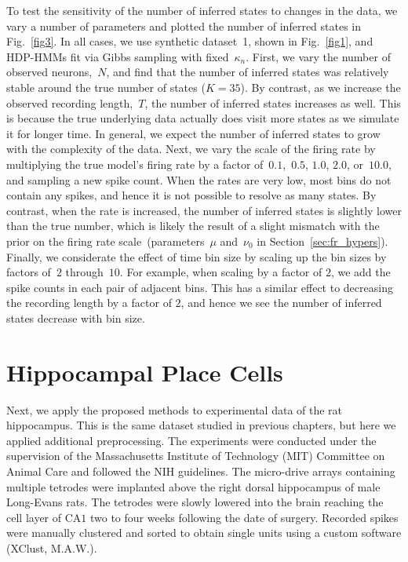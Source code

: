 To test the sensitivity of the number of inferred states to changes in
the data, we vary a number of parameters and plotted the number of
inferred states in Fig.~\ref{fig3}. In all cases, we use synthetic
dataset~1, shown in Fig.~\ref{fig1}, and HDP-HMMs fit via Gibbs
sampling with fixed~$\kappa_n$. First, we vary the number of
observed neurons,~$N$, and find that the number of inferred states was
relatively stable around the true number of states ($K=35$). By
contrast, as we increase the observed recording length,~$T$, the
number of inferred states increases as well. This is because the true
underlying data actually does visit more states as we simulate it for
longer time. In general, we expect the number of inferred states to
grow with the complexity of the data. Next, we vary the scale of the
firing rate by multiplying the true model's firing rate by a factor
of~$0.1$,~$0.5$, $1.0$, $2.0$, or~$10.0$, and sampling a new spike
count. When the rates are very low, most bins do not contain any
spikes, and hence it is not possible to resolve as many states. By
contrast, when the rate is increased, the number of inferred states is
slightly lower than the true number, which is likely the result of a
slight mismatch with the prior on the firing rate
scale~(parameters~$\mu$ and~$\nu_0$ in
Section~\ref{sec:fr_hypers}). Finally, we considerate the effect of
time bin size by scaling up the bin sizes by factors of~$2$
through~$10$. For example, when scaling by a factor of $2$, we add the
spike counts in each pair of adjacent bins. This has a similar effect
to decreasing the recording length by a factor of $2$, and hence we see
the number of inferred states decrease with bin size.

\section{Hippocampal Place Cells} 

Next, we apply the proposed methods to experimental data of the rat
hippocampus. This is the same dataset studied in previous chapters, but
here we applied additional preprocessing.
The experiments were conducted under the supervision of the
Massachusetts Institute of Technology (MIT) Committee on Animal Care
and followed the NIH guidelines.  The micro-drive arrays containing
multiple tetrodes were implanted above the right dorsal hippocampus of
male Long-Evans rats. The tetrodes were slowly lowered into the brain
reaching the cell layer of CA$1$ two to four weeks following the date of
surgery. Recorded spikes were manually clustered and sorted to obtain
single units using a custom software (XClust, M.A.W.).


